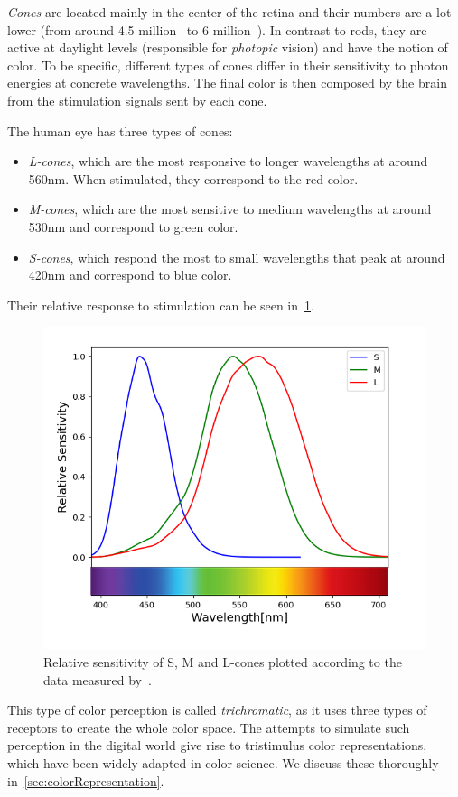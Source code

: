 \emph{Cones} are located mainly in the center of the retina and their numbers are a lot lower (from around 4.5 million~\cite{rods91cones4f5} to 6 million~\cite{rods125cones6}). In contrast to rods, they are active at daylight levels (responsible for \emph{photopic} vision) and have the notion of color. To be specific, different types of cones differ in their sensitivity to photon energies at concrete wavelengths. The final color is then composed by the brain from the stimulation signals sent by each cone.

The human eye has three types of cones:
\begin{itemize}
	\item \emph{L-cones}, which are the most responsive to longer wavelengths at around 560nm. When stimulated, they correspond to the red color.
	\item \emph{M-cones}, which are the most sensitive to medium wavelengths at around 530nm and correspond to green color.
	\item \emph{S-cones}, which respond the most to small wavelengths that peak at around 420nm and correspond to blue color.
\end{itemize}

Their relative response to stimulation can be seen in~\cref{fig:coneSensitivity}.
\begin{figure}[t]
	\centering
	\includegraphics[width=0.5\linewidth]{img/cone_sensitivity.png}
	\caption{Relative sensitivity of S, M and L-cones plotted according to the data measured by~\citet{coneSensitivities}.} \label{fig:coneSensitivity}
\end{figure}

This type of color perception is called \emph{trichromatic}, as it uses three types of receptors to create the whole color space. The attempts to simulate such perception in the digital world give rise to tristimulus color representations, which have been widely adapted in color science. We discuss these thoroughly in~\cref{sec:colorRepresentation}.

